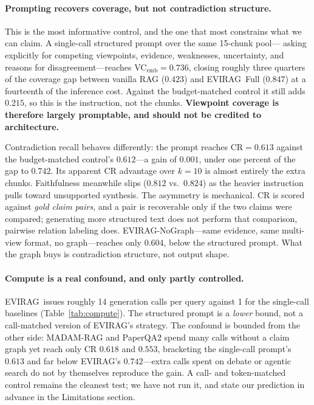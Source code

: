 \documentclass[11pt]{article}
\newcommand{\system}{\textsc{EVIRAG}\xspace}
\begin{document}
\paragraph{Prompting recovers coverage, but not contradiction structure.}
This is the most informative control, and the one that most constrains what we
can claim.  A single-call structured prompt over the same 15-chunk pool---%
asking explicitly for competing viewpoints, evidence, weaknesses, uncertainty,
and reasons for disagreement---reaches VC$_\text{emb}{=}0.736$, closing roughly
three quarters of the coverage gap between vanilla RAG ($0.423$) and \system\
Full ($0.847$) at a fourteenth of the inference cost.  Against the
budget-matched control it still adds $0.215$, so this is the instruction, not
the chunks.  \textbf{Viewpoint coverage is therefore largely promptable, and
should not be credited to architecture.}

Contradiction recall behaves differently: the prompt reaches CR$=0.613$ against
the budget-matched control's $0.612$---a gain of $0.001$, under one percent of
the gap to $0.742$.  Its apparent CR advantage over $k{=}10$ is almost entirely
the extra chunks.  Faithfulness meanwhile slips ($0.812$ vs.\ $0.824$) as the
heavier instruction pulls toward unsupported synthesis.  The asymmetry is
mechanical.  CR is scored against \emph{gold claim
pairs}, and a pair is recoverable only if the two claims were compared;
generating more structured text does not perform that comparison, pairwise
relation labeling does.  \system-NoGraph---same evidence, same multi-view
format, no graph---reaches only $0.604$, below the structured prompt.  What the
graph buys is contradiction structure, not output shape.

\paragraph{Compute is a real confound, and only partly controlled.}
\system\ issues roughly 14 generation calls per query against 1 for the
single-call baselines (Table~\ref{tab:compute}).  The structured prompt is a
\emph{lower} bound, not a call-matched version of \system's strategy.  The
confound is bounded from the other side: MADAM-RAG and PaperQA2 spend many
calls without a claim graph yet reach only CR $0.618$ and $0.553$, bracketing
the single-call prompt's $0.613$ and far below \system's $0.742$---extra calls
spent on debate or agentic search do not by themselves reproduce the gain.  A
call- and token-matched control remains the cleanest test; we have not run it,
and state our prediction in advance in the Limitations section.
\end{document}
